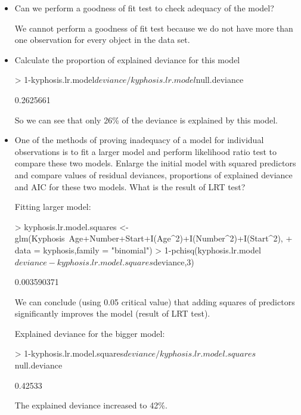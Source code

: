 \documentclass[a4paper]{article}
\begin{document}
\begin{itemize}
\item Can we perform a goodness of fit test to check adequacy of the model?

We cannot perform a goodness of fit test because we do not have more than one
observation for every object in the data set.

\item Calculate the proportion of explained deviance for this model

\begin{Schunk}
\begin{Sinput}
> 1-kyphosis.lr.model$deviance/kyphosis.lr.model$null.deviance	
\end{Sinput}
\begin{Soutput}
[1] 0.2625661
\end{Soutput}
\end{Schunk}
So we can see that only 26\% of the deviance is explained by this
model.

\item One of the methods of proving inadequacy of a model for individual
observations is to fit a larger model and perform likelihood ratio test to
compare these two models. Enlarge the initial model with squared predictors and compare values of residual deviances, 
proportions of explained deviance and AIC for these two models. What is the result of LRT test?

Fitting larger model:
\begin{Schunk}
\begin{Sinput}
> kyphosis.lr.model.squares <- glm(Kyphosis~Age+Number+Start+I(Age^2)+I(Number^2)+I(Start^2),
+ 		data = kyphosis,family = "binomial")	
> 1-pchisq(kyphosis.lr.model$deviance-kyphosis.lr.model.squares$deviance,3)
\end{Sinput}
\begin{Soutput}
[1] 0.003590371
\end{Soutput}
\end{Schunk}
We can conclude (using 0.05 critical value) that adding squares of predictors
significantly improves the model (result of LRT test).

Explained deviance for the bigger model:
\begin{Schunk}
\begin{Sinput}
> 1-kyphosis.lr.model.squares$deviance/kyphosis.lr.model.squares$null.deviance	
\end{Sinput}
\begin{Soutput}
[1] 0.42533
\end{Soutput}
\end{Schunk}
The explained deviance increased to 42\%.


\end{itemize}
\end{document}
